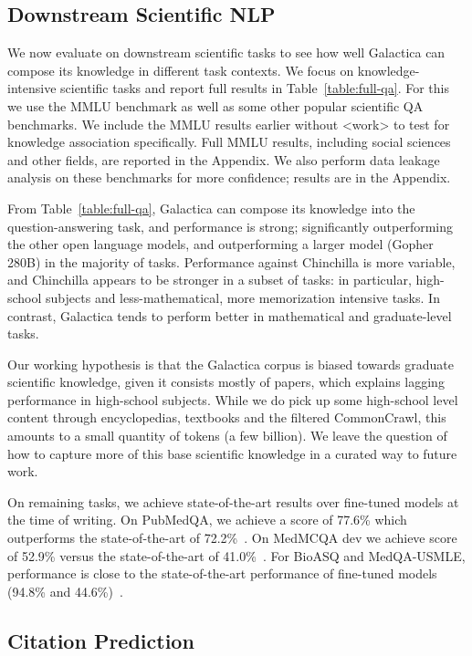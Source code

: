 \subsection{Downstream Scientific NLP}

We now evaluate on downstream scientific tasks to see how well Galactica can compose its knowledge in different task contexts. We focus on knowledge-intensive scientific tasks and report full results in Table~\ref{table:full-qa}. For this we use the MMLU benchmark as well as some other popular scientific QA benchmarks. We include the MMLU results earlier without <work> to test for knowledge association specifically. Full MMLU results, including social sciences and other fields, are reported in the Appendix. We also perform data leakage analysis on these benchmarks for more confidence; results are in the Appendix.

From Table~\ref{table:full-qa}, Galactica can compose its knowledge into the question-answering task, and performance is strong; significantly outperforming the other open language models, and outperforming a larger model (Gopher 280B) in the majority of tasks. Performance against Chinchilla is more variable, and Chinchilla appears to be  stronger in a subset of tasks: in particular, high-school subjects and less-mathematical, more memorization intensive tasks. In contrast, Galactica tends to perform better in mathematical and graduate-level tasks.

Our working hypothesis is that the Galactica corpus is biased towards graduate scientific knowledge, given it consists mostly of papers, which explains lagging performance in high-school subjects. While we do pick up some high-school level content through encyclopedias, textbooks and the filtered CommonCrawl, this amounts to a small quantity of tokens (a few billion). We leave the question of how to capture more of this base scientific knowledge in a curated way to future work.

On remaining tasks, we achieve state-of-the-art results over fine-tuned models at the time of writing. On PubMedQA, we achieve a score of 77.6\% which outperforms the state-of-the-art of 72.2\%~\citep{BioLinkBERT}. On MedMCQA dev we achieve score of 52.9\% versus the state-of-the-art of 41.0\%~\citep{PubMedBERT}. For BioASQ and MedQA-USMLE, performance is close to the state-of-the-art performance of fine-tuned models (94.8\% and 44.6\%)~\citep{BioLinkBERT}.

\subsection{Citation Prediction}

